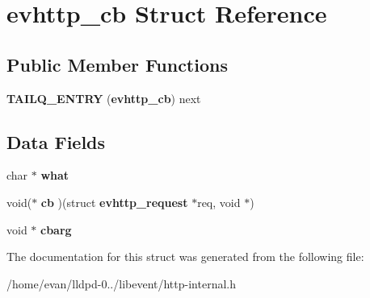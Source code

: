 \section{evhttp\-\_\-cb \-Struct \-Reference}
\label{structevhttp__cb}
\subsection*{\-Public \-Member \-Functions}
\begin{DoxyCompactItemize}
\item 
{\bfseries \-T\-A\-I\-L\-Q\-\_\-\-E\-N\-T\-R\-Y} ({\bf evhttp\-\_\-cb}) next\label{structevhttp__cb_addc652df786731e060e016d570a97111}

\end{DoxyCompactItemize}
\subsection*{\-Data \-Fields}
\begin{DoxyCompactItemize}
\item 
char $\ast$ {\bfseries what}\label{structevhttp__cb_a2b4552b5ef8ac80af5815db5f370b9ea}

\item 
void($\ast$ {\bfseries cb} )(struct {\bf evhttp\-\_\-request} $\ast$req, void $\ast$)\label{structevhttp__cb_ac8fdd56d41fcd9aea8d66f86b2dc1045}

\item 
void $\ast$ {\bfseries cbarg}\label{structevhttp__cb_aafd3d1a6343925cb274875556a6faa0e}

\end{DoxyCompactItemize}


\-The documentation for this struct was generated from the following file\-:\begin{DoxyCompactItemize}
\item 
/home/evan/lldpd-\/0../libevent/http-\/internal.\-h\end{DoxyCompactItemize}
